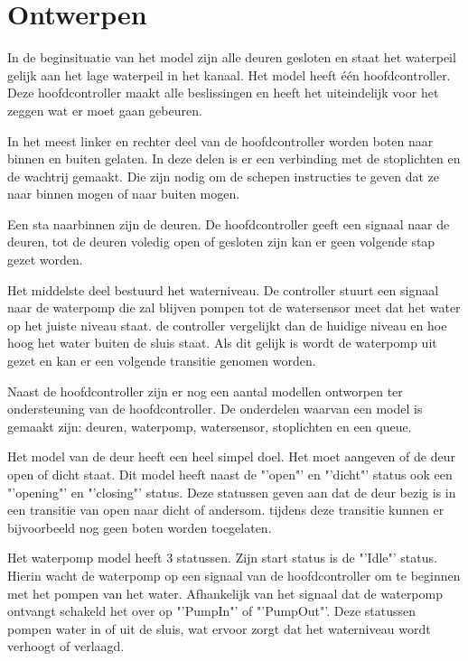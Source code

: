 \documentclass{article}
\begin{document}
\clearpage %
\section{Ontwerpen} %
In de beginsituatie van het model zijn alle deuren gesloten en staat het waterpeil gelijk aan het lage waterpeil in het kanaal. Het model heeft één hoofdcontroller. Deze hoofdcontroller maakt alle beslissingen en heeft het uiteindelijk voor het zeggen wat er moet gaan gebeuren.

In het meest linker en rechter deel van de hoofdcontroller worden boten naar binnen en buiten gelaten. In deze delen is er een verbinding met de stoplichten en de wachtrij gemaakt. Die zijn nodig om de schepen instructies te geven dat ze naar binnen mogen of naar buiten mogen.

Een sta naarbinnen zijn de deuren. De hoofdcontroller geeft een signaal naar de deuren, tot de deuren voledig open of gesloten zijn kan er geen volgende stap gezet worden.

Het middelste deel bestuurd het waterniveau. De controller stuurt een signaal naar de waterpomp die zal blijven pompen tot de watersensor meet dat het water op het juiste niveau staat. de controller vergelijkt dan de huidige niveau en hoe hoog het water buiten de sluis staat. Als dit gelijk is wordt de waterpomp uit gezet en kan er een volgende transitie genomen worden.

Naast de hoofdcontroller zijn er nog een aantal modellen ontworpen ter ondersteuning van de hoofdcontroller. De onderdelen waarvan een model is gemaakt zijn: deuren, waterpomp, watersensor, stoplichten en een queue.

\vskip0.3cm

Het model van de deur heeft een heel simpel doel. Het moet aangeven of de deur open of dicht staat. Dit model heeft naast de "'open"' en "'dicht"' status ook een "'opening"' en "'closing"' status. Deze statussen geven aan dat de deur bezig is in een transitie van open naar dicht of andersom. tijdens deze transitie kunnen er bijvoorbeeld nog geen boten worden toegelaten.

Het waterpomp model heeft 3 statussen. Zijn start status is de "'Idle"' status. Hierin wacht de waterpomp op een signaal van de hoofdcontroller om te beginnen met het pompen van het water. Afhankelijk van het signaal dat de waterpomp ontvangt schakeld het over op "'PumpIn"' of "'PumpOut"'. Deze statussen pompen water in of uit de sluis, wat ervoor zorgt dat het waterniveau wordt verhoogt of verlaagd.
\end{document}
